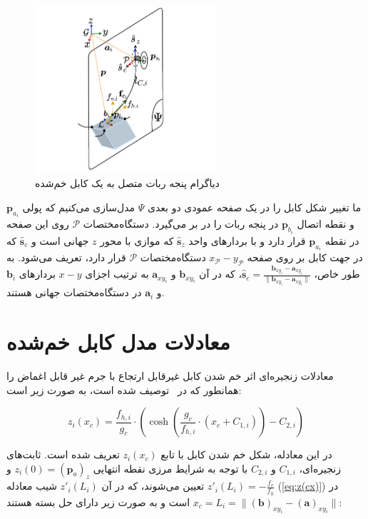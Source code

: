 \begin{figure}[t]
	\centering
	\includegraphics[width=0.6\textwidth]{img/robot_frame.pdf}
	\caption{دیاگرام پنجه ربات متصل به یک کابل  خم‌شده}
	\label{fig:frame_robot}
\end{figure}

ما تغییر شکل کابل را در یک صفحه عمودی دو بعدی $\Psi$ مدل‌سازی می‌کنیم که پولی $\bm{p}_{a_i}$ و نقطه اتصال $\bm{p}_{b_i}$ در پنجه ربات را در بر می‌گیرد. دستگاه‌مختصات
$\mathcal{P}$
روی این صفحه در نقطه $\bm{p}_{a_i}$ قرار دارد و با بردارهای واحد $\hat{\bm{s}}_z$ که موازی با محور $z$ جهانی است و $\hat{\bm{s}}_c$ که در جهت کابل بر روی صفحه $x_{\mathcal{P}}-y_{\mathcal{P}}$  دستگاه‌مختصات $\mathcal{P}$ قرار دارد، تعریف می‌شود.
به طور خاص،  $\hat{\bm{s}}_c = \frac{\bm{b}_{xy_i} - \bm{a}_{xy_i}}{\|\bm{b}_{xy_i} - \bm{a}_{xy_i}\|}$، که در آن $\bm{b}_{xy_i}$ و $\bm{a}_{xy_i}$ به ترتیب اجزای $x-y$ بردارهای $\bm{b}_{i}$ و $\bm{a}_{i}$ در دستگاه‌مختصات جهانی هستند.

\section{معادلات مدل کابل خم‌شده} \label{seq:modeling}

معادلات زنجیره‌ای اثر خم شدن کابل غیرقابل ارتجاع با جرم غیر قابل اغماض را همانطور که در~\cite{pott2013cable} توصیف شده است، به صورت زیر است:

\begin{equation} \label{eq:z(cx)}
	z_i(x_c) = \frac{f_{h,i}}{g_c} \cdot \left( \cosh \left( \frac{g_c}{f_{h,i}} \cdot (x_c + C_{1,i}) \right) - C_{2,i} \right)
\end{equation} 

در این معادله، شکل خم شدن کابل با تابع $z_i(x_c)$ تعریف شده است. ثابت‌های زنجیره‌ای، $C_{1,i}$ و $C_{2,i}$ با توجه به شرایط مرزی نقطه انتهایی $z_i(0)=(\bm{p}_{a})_z$ و $z'_i(L_i)=-\frac{f_v}{f_h}$ تعیین می‌شوند، که در آن $z'_i(L_i)$ شیب معادله (\ref{eq:z(cx)}) در \(x_c = L_i = \|(\bm{b})_{xy_i} - (\bm{a})_{xy_i}\|\) است و به صورت زیر دارای ‌حل بسته هستند:

